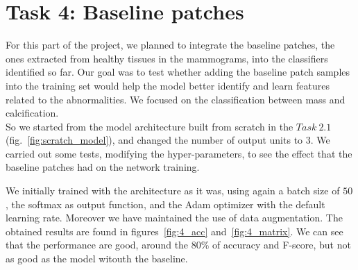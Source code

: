 \documentclass[11pt,a4paper,oneside]{article}
\begin{document}
\clearpage

\section{Task 4: Baseline patches}
For this part of the project, we planned to integrate the baseline patches, the ones extracted from healthy tissues in the mammograms, into the classifiers identified so far. Our goal was to test whether adding the baseline patch samples into the training set would help the model better identify and learn features related to the abnormalities.
We focused on the classification between mass and calcification. \\
So we started from the model architecture built from scratch in the $Task\ 2.1$ (fig.~\ref{fig:scratch_model}), and changed the number of output units to $3$. We carried out some tests, modifying the hyper-parameters, to see the effect that the baseline patches had on the network training.

We initially trained with the architecture as it was, using again a batch size of $50$, the softmax as output function, and the Adam optimizer with the default learning rate. Moreover we have maintained the use of data augmentation. The obtained results are found in figures~\ref{fig:4_acc} and~\ref{fig:4_matrix}. We can see that the performance are good, around the $80\%$ of accuracy and F-score, but not as good as the model witouth the baseline. 
\end{document}
